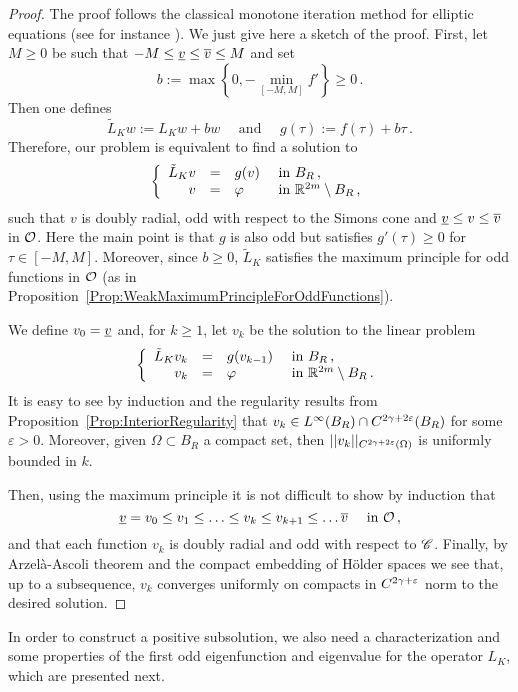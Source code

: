 \begin{proof}
	The proof follows the classical monotone iteration method for elliptic equations (see for instance \cite{Evans}). We just give here a sketch of the proof. 
	First, let $M \geq 0$ be such that $-M \leq \underline{v} \leq \overline{v} \leq M$ and set
	$$
	b := \max \left \{{0, - \min_{[-M,M]}f'}\right \}\geq 0\,.
	$$
	Then one defines 
	$$
	\tilde{L}_K w := L_Kw + b w 	\quad \text{ and } \quad 	g(\tau) := f(\tau) + b \tau\,.
	$$
	Therefore, our problem is equivalent to find a solution to
	$$
	\left\{\begin{array}{rcll}
	\tilde{L}_Kv & = & g(v) & \textrm{ in } B_R\,, \\
	v &=& \varphi &  \textrm{ in } \mathbb{R}^{2m} \setminus B_R\,, 
	\end{array} \right.
	$$
	such that $v$ is doubly radial, odd with respect to the Simons cone and  $\underline{v} \leq v \leq \overline{v}$ in $\mathcal{O}$. Here the main point is that $g$ is also odd but satisfies $g'(\tau) \geq 0$ for $\tau \in [-M,M]$. Moreover, since $b \geq 0$, $\tilde{L}_K$ satisfies the maximum principle for odd functions in $\mathcal{O}$ (as in Proposition~\ref{Prop:WeakMaximumPrincipleForOddFunctions}).
	
	We define $v_0 = \underline{v}$ and, for $k\geq 1$, let $v_k$ be the solution to the linear problem
	$$
	\left\{\begin{array}{rcll}
	\tilde{L}_K v_k & = & g(v_{k-1}) & \textrm{ in } B_R\,, \\
	v_k &=& \varphi &  \textrm{ in } \mathbb{R}^{2m} \setminus B_R\,. 
	\end{array} \right.
	$$
	It is easy to see by induction and the regularity results from Proposition~\ref{Prop:InteriorRegularity} that $v_k\in L^\infty(B_R) \cap C^{2\gamma+2\varepsilon}(B_R)$ for some $\varepsilon>0$. Moreover, given $\Omega\subset B_R$ a compact set, then $||v_k||_{C^{2\gamma+2\varepsilon}(\Omega)}$ is uniformly bounded in $k$.
	
	Then, using the maximum principle it is not difficult to show by induction that 
	$$
	\underline{v} = v_0 \leq v_1 \leq \ldots \leq v_k \leq v_{k+1} \leq \ldots \overline{v} \quad \text{ in }\mathcal{O}\,,
	$$
	and that each function $v
	_k$ is doubly radial and odd with respect to $\mathscr{C}$. Finally, by Arzelà-Ascoli theorem and the compact embedding of H\"older spaces we see that, up to a subsequence, $v_k$ converges uniformly on compacts in $C^{2\gamma+\varepsilon}$ norm to the desired solution.
\end{proof}

In order to construct a positive subsolution, we also need a characterization and some properties of the first odd eigenfunction and eigenvalue for the operator $L_K$, which are presented next.

